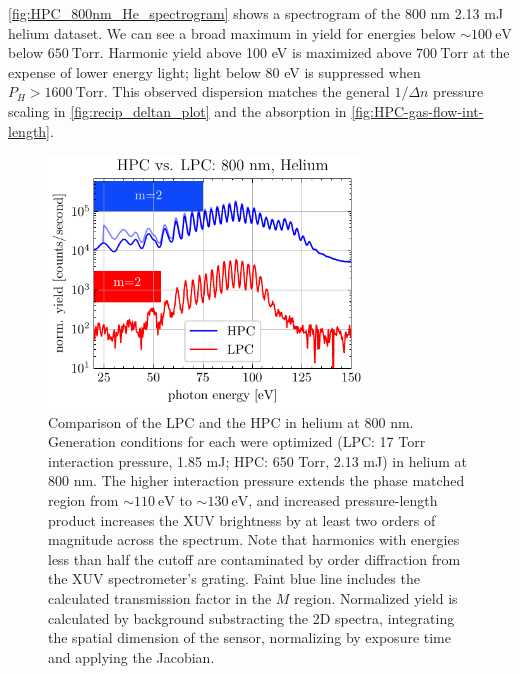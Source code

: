 \cref{fig:HPC_800nm_He_spectrogram} shows a spectrogram of the 800 nm 2.13 mJ helium dataset. We can see a broad maximum in yield for energies below $\sim 100 \ \textrm{eV}$ below $650 \ \textrm{Torr}$. Harmonic yield above 100 eV is maximized above $700 \ \textrm{Torr}$ at the expense of lower energy light; light below 80 eV is suppressed when $P_H > 1600 \ \textrm{Torr}$. This observed dispersion matches the general $1/\Delta n$ pressure scaling in \cref{fig:recip_deltan_plot} and the absorption in \cref{fig:HPC-gas-flow-int-length}.

\begin{figure}
	\centering
	\includegraphics[width=0.75\textwidth]{figures/chap3/HPC_vs_LPC_800He.pdf}
	\caption{Comparison of the LPC and the HPC in helium at 800 nm. Generation conditions for each were optimized (LPC: 17 Torr interaction pressure, 1.85 mJ; HPC: 650 Torr, 2.13 mJ) in helium at 800 nm. The higher interaction pressure extends the phase matched region from $ \sim 110 \ \textrm{eV}$ to $\sim 130 \ \textrm{eV}$, and increased pressure-length product increases the XUV brightness by at least two orders of magnitude across the spectrum. Note that harmonics with energies less than half the cutoff are contaminated by  order diffraction from the XUV spectrometer's grating. Faint blue line includes the calculated transmission factor in the $M$ region. Normalized yield is calculated by background substracting the 2D spectra, integrating the spatial dimension of the sensor, normalizing by exposure time and applying the Jacobian.}
	\label{fig:HHG-HPCvsLPCHPC}
\end{figure}


